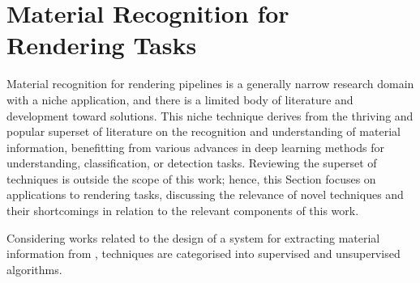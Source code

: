 \section{Material Recognition for Rendering Tasks}
Material recognition for rendering pipelines is a generally narrow research domain with a niche application, and there is a limited body of literature and development toward solutions. This niche technique derives from the thriving and popular superset of literature on the recognition and understanding of material information, benefitting from various advances in deep learning methods for understanding, classification, or detection tasks. Reviewing the superset of techniques is outside the scope of this work; hence, this Section focuses on applications to rendering tasks, discussing the relevance of novel techniques and their shortcomings in relation to the relevant components of this work.\par
Considering works related to the design of a system for extracting material information from , techniques are categorised into supervised and unsupervised algorithms. 

